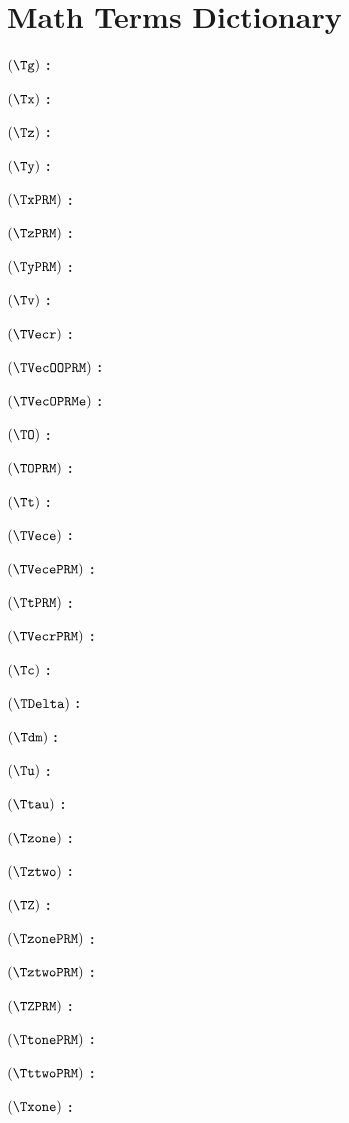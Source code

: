 \section*{Math Terms Dictionary}

$( \Tg )$ \textbf{:} \Tgdef

$( \Tx )$ \textbf{:} \Txdef

$( \Tz )$ \textbf{:} \Tzdef

$( \Ty )$ \textbf{:} \Tydef

$( \TxPRM )$ \textbf{:} \TxPRMdef

$( \TzPRM )$ \textbf{:} \TzPRMdef

$( \TyPRM )$ \textbf{:} \TyPRMdef

$( \Tv )$ \textbf{:} \Tvdef

$( \TVecr )$ \textbf{:} \TVecrdef

$( \TVecOOPRM )$ \textbf{:} \TVecOOPRMdef

$( \TVecOPRMe )$ \textbf{:} \TVecOPRMedef

$( \TO )$ \textbf{:} \TOdef

$( \TOPRM )$ \textbf{:} \TOPRMdef

$( \Tt )$ \textbf{:} \Ttdef

$( \TVece )$ \textbf{:} \TVecedef

$( \TVecePRM )$ \textbf{:} \TVecePRMdef

$( \TtPRM )$ \textbf{:} \TtPRMdef

$( \TVecrPRM )$ \textbf{:} \TVecrPRMdef

$( \Tc )$ \textbf{:} \Tcdef

$( \TDelta )$ \textbf{:} \TDeltadef

$( \Tdm)$ \textbf{:} \Tdmdef

$( \Tu )$ \textbf{:} \Tudef

$( \Ttau )$ \textbf{:} \Ttaudef

$( \Tzone )$ \textbf{:} \Tzonedef

$( \Tztwo )$ \textbf{:} \Tztwodef

$( \TZ )$ \textbf{:} \TZdef

$( \TzonePRM )$ \textbf{:} \TzonePRMdef

$( \TztwoPRM )$ \textbf{:} \TztwoPRMdef

$( \TZPRM )$ \textbf{:} \TZPRMdef

$( \TtonePRM )$ \textbf{:} \TtonePRMdef

$( \TttwoPRM )$ \textbf{:} \TttwoPRMdef

$( \Txone )$ \textbf{:} \Txonedef

